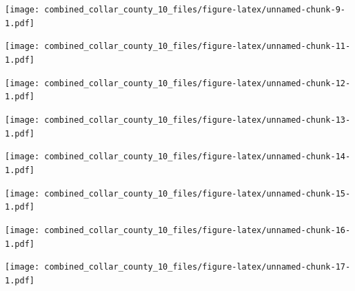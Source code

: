 \documentclass[
]{article}
\begin{document}
\texttt{[image: combined\_collar\_county\_10\_files/figure-latex/unnamed-chunk-9-1.pdf]}

\texttt{[image: combined\_collar\_county\_10\_files/figure-latex/unnamed-chunk-11-1.pdf]}

\texttt{[image: combined\_collar\_county\_10\_files/figure-latex/unnamed-chunk-12-1.pdf]}

\texttt{[image: combined\_collar\_county\_10\_files/figure-latex/unnamed-chunk-13-1.pdf]}

\texttt{[image: combined\_collar\_county\_10\_files/figure-latex/unnamed-chunk-14-1.pdf]}

\texttt{[image: combined\_collar\_county\_10\_files/figure-latex/unnamed-chunk-15-1.pdf]}

\texttt{[image: combined\_collar\_county\_10\_files/figure-latex/unnamed-chunk-16-1.pdf]}

\texttt{[image: combined\_collar\_county\_10\_files/figure-latex/unnamed-chunk-17-1.pdf]}
\end{document}
